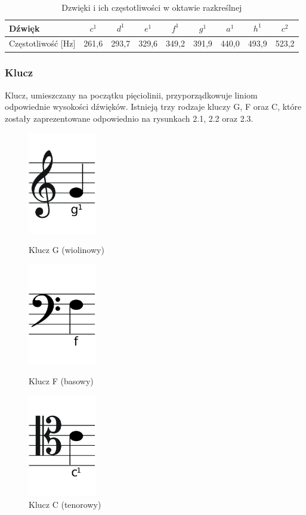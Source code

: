 \documentclass[printmode, eng, openany]{mgr}
\newcommand\tab[1][1cm]{\hspace*{#1}}
\begin{document}
\begin{table}[!htb]
\centering
\caption{Dzwięki i ich częstotliwości w oktawie razkreślnej}
\begin{tabular}{|l|c|c|c|c|c|c|c|c|}
\hline
Dźwięk & $c^{1}$ & $d^{1}$ & $e^{1}$ & $f^{1}$ & $g^{1}$ & $a^{1}$ & $h^{1}$ & $c^{2}$  \\
\hline
Częstotliwość [Hz] & 261,6 & 293,7 & 329,6 & 349,2 & 391,9 & 440,0 & 493,9 & 523,2 \\
\hline
\end{tabular}
\end{table}
\subsubsection{Klucz}
\tab Klucz, umieszczany na początku pięciolinii, przyporządkowuje liniom odpowiednie wysokości dźwięków. Istnieją trzy rodzaje kluczy G, F oraz C, które zostały zaprezentowane odpowiednio na rysunkach 2.1, 2.2 oraz 2.3.

\begin{figure}[!htb]
\begin{minipage}{0.31\textwidth}
\centering
\includegraphics[width=3cm]{G}
\caption{Klucz G (wiolinowy)}
\end{minipage}
\begin{minipage}{0.31\textwidth}
\centering
\includegraphics[width=3cm]{F}
\caption{Klucz F (basowy)}
\end{minipage}
\begin{minipage}{0.31\textwidth}
\centering
\includegraphics[width=3cm]{C}
\caption{Klucz C (tenorowy)}
\end{minipage}
\end{figure}
\end{document}
